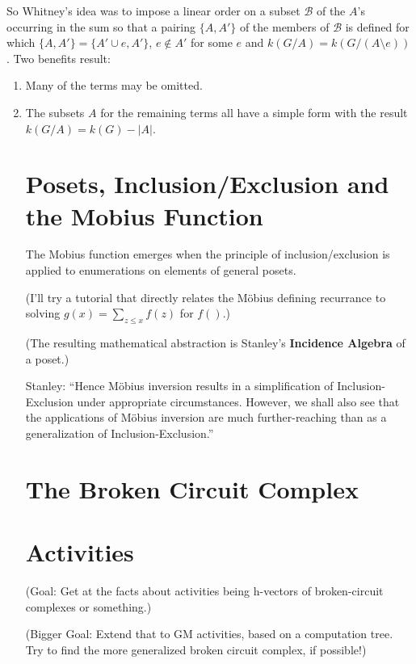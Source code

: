 \documentclass{article}
\begin{document}
So Whitney's idea was to impose a linear order on a subset $\mathcal{B}$
of the $A$'s occurring 
in the sum so that a pairing $\{A,A'\}$ of the members of $\mathcal{B}$ 
is defined for which $\{A,A'\}=\{A'\cup e, A'\}$, $e\not\in A'$ for some $e$
and $k(G/A) = k(G/(A\setminus e))$.  Two benefits result:
\begin{enumerate}
\item Many of the terms may be omitted.
\item The subsets $A$ for the remaining terms all have a simple form with the 
result $k(G/A) = k(G) - |A| $.

\section{Posets, Inclusion/Exclusion and the Mobius Function}

The Mobius function emerges when the principle of inclusion/exclusion is
applied to enumerations on elements of general posets.

(I'll try a tutorial that directly relates the M\"{o}bius defining recurrance to
solving $g(x) = \sum_{z\le x}f(z)$ for $f()$.)

(The resulting mathematical abstraction is Stanley's 
\textbf{Incidence Algebra} of a poset.)

Stanley: ``Hence M\"{o}bius inversion results in a simplification
of Inclusion-Exclusion under appropriate circumstances. However, we shall also see that
the applications of M\"{o}bius inversion are much 
further-reaching than as a generalization of
Inclusion-Exclusion.''

\section{The Broken Circuit Complex}

\section{Activities}

(Goal: Get at the facts about activities being h-vectors of broken-circuit complexes or 
something.)

(Bigger Goal: Extend that to GM activities, based on a computation tree.  Try to find 
the more generalized broken circuit complex, if possible!)






\end{enumerate}


\end{document}

